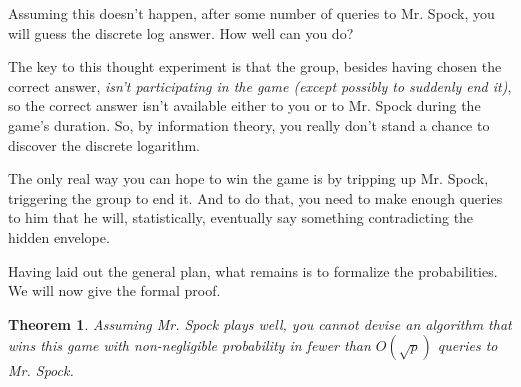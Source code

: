 \documentclass{article}
\theoremstyle{plain}
\newtheorem{theorem}{Theorem}
\theoremstyle{definition}
\theoremstyle{remark}
\numberwithin{theorem}{section}
\begin{document}
Assuming this doesn't happen, after some number of queries to Mr. Spock, you will guess the discrete log answer.  How well can you do?

The key to this thought experiment is that the group, besides having chosen the correct answer, \emph{isn't participating in the game (except possibly to suddenly end it)}, so the correct answer isn't available either to you or to Mr. Spock during the game's duration.  So, by information theory, you really don't stand a chance to discover the discrete logarithm.

The only real way you can hope to win the game is by tripping up Mr. Spock, triggering the group to end it.  And to do that, you need to make enough queries to him that he will, statistically, eventually say something contradicting the hidden envelope.

Having laid out the general plan, what remains is to formalize the probabilities.  We will now give the formal proof.

\begin{theorem}
    Assuming Mr. Spock plays well, you cannot devise an algorithm that wins this game with non-negligible probability in fewer than $O(\sqrt{p})$ queries to Mr. Spock.
    \end{theorem}
\end{document}
